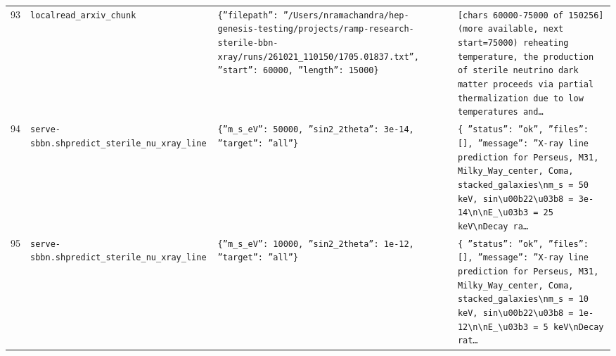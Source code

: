 \documentclass[11pt,a4paper]{article}
\begin{document}
\begin{longtable}{@{}p{}p{}p{}p{}@{}}
93 & \texttt{local}\newline\texttt{read\_\allowbreak{}arxiv\_\allowbreak{}chunk} & \texttt{\{''filepath'':\allowbreak{} ''/\allowbreak{}Users/\allowbreak{}nramachandra/\allowbreak{}hep-genesis-testing/\allowbreak{}projects/\allowbreak{}ramp-research-sterile-bbn-xray/\allowbreak{}runs/\allowbreak{}261021\_\allowbreak{}110150/\allowbreak{}1705.01837.txt'',\allowbreak{} ''start'':\allowbreak{} 60000,\allowbreak{} ''length'':\allowbreak{} 15000\}\allowbreak{}} & \texttt{[chars 60000-75000 of 150256]\allowbreak{} (more available,\allowbreak{} next start=\allowbreak{}75000)\allowbreak{}   reheating temperature,\allowbreak{} the production of sterile neutrino dark matter proceeds via partial thermalization due to low temperatures and\ldots{}\allowbreak{}} \\
94 & \texttt{serve-sbbn.sh}\newline\texttt{predict\_\allowbreak{}sterile\_\allowbreak{}nu\_\allowbreak{}xray\_\allowbreak{}line} & \texttt{\{''m\_\allowbreak{}s\_\allowbreak{}eV'':\allowbreak{} 50000,\allowbreak{} ''sin2\_\allowbreak{}2theta'':\allowbreak{} 3e-14,\allowbreak{} ''target'':\allowbreak{} ''all''\}\allowbreak{}} & \texttt{\{   ''status'':\allowbreak{} ''ok'',\allowbreak{}   ''files'':\allowbreak{} []\allowbreak{},\allowbreak{}   ''message'':\allowbreak{} ''X-ray line prediction for Perseus,\allowbreak{} M31,\allowbreak{} Milky\_\allowbreak{}Way\_\allowbreak{}center,\allowbreak{} Coma,\allowbreak{} stacked\_\allowbreak{}galaxies\textbackslash{}\allowbreak{}nm\_\allowbreak{}s =\allowbreak{} 50 keV,\allowbreak{} sin\textbackslash{}\allowbreak{}u00b22\textbackslash{}\allowbreak{}u03b8 =\allowbreak{} 3e-14\textbackslash{}\allowbreak{}n\textbackslash{}\allowbreak{}nE\_\allowbreak{}\textbackslash{}\allowbreak{}u03b3 =\allowbreak{} 25 keV\textbackslash{}\allowbreak{}nDecay ra\ldots{}\allowbreak{}} \\
95 & \texttt{serve-sbbn.sh}\newline\texttt{predict\_\allowbreak{}sterile\_\allowbreak{}nu\_\allowbreak{}xray\_\allowbreak{}line} & \texttt{\{''m\_\allowbreak{}s\_\allowbreak{}eV'':\allowbreak{} 10000,\allowbreak{} ''sin2\_\allowbreak{}2theta'':\allowbreak{} 1e-12,\allowbreak{} ''target'':\allowbreak{} ''all''\}\allowbreak{}} & \texttt{\{   ''status'':\allowbreak{} ''ok'',\allowbreak{}   ''files'':\allowbreak{} []\allowbreak{},\allowbreak{}   ''message'':\allowbreak{} ''X-ray line prediction for Perseus,\allowbreak{} M31,\allowbreak{} Milky\_\allowbreak{}Way\_\allowbreak{}center,\allowbreak{} Coma,\allowbreak{} stacked\_\allowbreak{}galaxies\textbackslash{}\allowbreak{}nm\_\allowbreak{}s =\allowbreak{} 10 keV,\allowbreak{} sin\textbackslash{}\allowbreak{}u00b22\textbackslash{}\allowbreak{}u03b8 =\allowbreak{} 1e-12\textbackslash{}\allowbreak{}n\textbackslash{}\allowbreak{}nE\_\allowbreak{}\textbackslash{}\allowbreak{}u03b3 =\allowbreak{} 5 keV\textbackslash{}\allowbreak{}nDecay rat\ldots{}\allowbreak{}} \\

\end{longtable}
\end{document}
